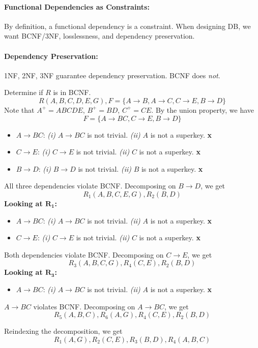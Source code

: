 \documentclass{report}
\newenvironment{example}{\begin{tcolorbox}[title={Example},colback=green!5!white,colframe=black!75!green]}{\end{tcolorbox}}
\renewcommand{\bf}[1]{\textbf{{#1}}}
\renewcommand{\it}[1]{\textit{{#1}}}
\begin{document}
\paragraph{Functional Dependencies as Constraints:} By definition, a functional
dependency is a constraint. When designing DB, we want BCNF/3NF, losslessness,
and dependency preservation.

\paragraph{Dependency Preservation:} 1NF, 2NF, 3NF guarantee dependency
preservation. BCNF does \it{not}.

\begin{example}
    Determine if $R$ is in BCNF.
    \[R(A, B, C, D, E, G), F = \{A \to B, A \to C, C \to E, B \to D\}\]
    Note that $A^+ = ABCDE$, $B^+ = BD$, $C^+ = CE$.
    By the union property, we have
    \[F = \{A \to BC, C \to E, B \to D\}\]

    \begin{itemize}[label=$\to$, itemsep=0em,]
        \item $A \to BC$: \it{(i)} $A \to BC$ is not trivial. \it{(ii)} $A$ is not a superkey. \textsf{\bf{x}}
        \item $C \to E$: \it{(i)} $C \to E$ is not trivial. \it{(ii)} $C$ is not a superkey. \textsf{\bf{x}}
        \item $B \to D$: \it{(i)} $B \to D$ is not trivial. \it{(ii)} $B$ is not a superkey. \textsf{\bf{x}}
    \end{itemize}

    \noindent All three dependencies violate BCNF. Decomposing on $B \to D$, we get
    \[R_1(A, B, C, E, G), R_2(B, D)\]
    \bf{Looking at $\bm{R_1}$:}
    \begin{itemize}[label=$\to$, itemsep=0em]
        \item $A \to BC$: \it{(i)} $A \to BC$ is not trivial. \it{(ii)} $A$ is not a superkey. \textsf{\bf{x}}
        \item $C \to E$: \it{(i)} $C \to E$ is not trivial. \it{(ii)} $C$ is not a superkey. \textsf{\bf{x}}
    \end{itemize}

    Both dependencies violate BCNF. Decomposing on $C \to E$, we get
    \[R_3(A, B, C, G), R_4(C, E), R_2(B, D)\]
    \bf{Looking at $\bm{R_3}$:}
    \begin{itemize}[label=$\to$, itemsep=0em]
        \item $A \to BC$: \it{(i)} $A \to BC$ is not trivial. \it{(ii)} $A$ is not a superkey. \textsf{\bf{x}}
    \end{itemize}

    \noindent $A \to BC$ violates BCNF. Decomposing on $A \to BC$, we get
    \[R_5(A, B, C), R_6(A, G), R_4(C, E), R_2(B, D)\]

    \noindent Reindexing the decomposition, we get
    \[R_1(A, G), R_2(C, E), R_3(B, D), R_4(A, B, C)\]
\end{example}
\vspace{5em}
\end{document}
